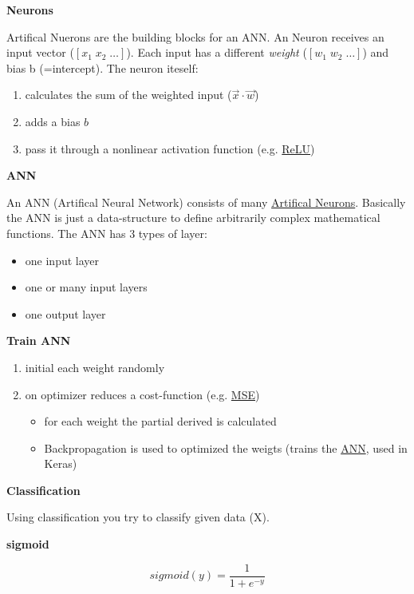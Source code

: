 \documentclass[11pt,twoside,landscape]{article}
\begin{document}
\begin{multicols}{3}
\textbf{Neurons}

Artifical Nuerons are the building blocks for an ANN.
An Neuron receives an input vector (\([x_1 \; x_2 \; \ldots]\)).
Each input has a different \emph{weight} (\([w_1 \; w_2 \; \ldots]\)) and bias b (=intercept).
The neuron iteself:
\begin{enumerate}
\item calculates the sum of the weighted input (\(\vec{x} \cdot \vec{w}\))
\item adds a bias \(b\)
\item pass it through a nonlinear activation function (e.g. \href{../../../roam/20211214121924-relu.org}{ReLU})
\end{enumerate}


\textbf{ANN}

An ANN (Artifical Neural Network) consists of many \href{../../../roam/20211214121841-artifical_neurons.org}{Artifical Neurons}.
Basically the ANN is just a data-structure to define arbitrarily complex mathematical functions.
The ANN has 3 types of layer:
\begin{itemize}
\item one input layer
\item one or many input layers
\item one output layer
\end{itemize}


\textbf{Train ANN}

\begin{enumerate}
\item initial each weight randomly
\item on optimizer reduces a cost-function (e.g. \href{../../../roam/20211004175550-mean_squared_error.org}{MSE})
\begin{itemize}
\item for each weight the partial derived is calculated
\item Backpropagation is used to optimized the weigts (trains the \href{../../../roam/20211214110732-ann.org}{ANN}, used in Keras)
\end{itemize}
\end{enumerate}

\textbf{Classification}

Using classification you try to classify given data (X).

\textbf{sigmoid}

\begin{equation}
  sigmoid(y) = \frac{1}{1 + e^{-y}}
\end{equation}


\end{multicols}
\end{document}
